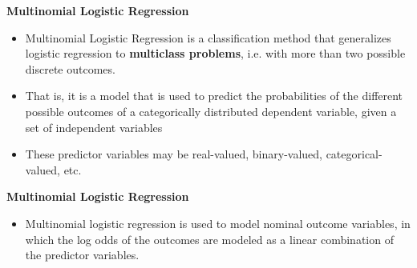 \documentclass[00-GLMregslides.tex]{subfiles}
\begin{document}
	
\begin{frame}
\Large
	
\textbf{Multinomial Logistic Regression}\\
\bigskip
\begin{itemize}
\item Multinomial Logistic Regression is a classification method that generalizes logistic regression to \textbf{multiclass problems}, 
i.e. with more than two possible discrete outcomes.
\item That is, it is a model that is used to predict the probabilities of the different possible outcomes of a 
categorically distributed dependent variable, given a set of independent 
variables 
\item These predictor variables may be real-valued, binary-valued, categorical-valued, etc.
\end{itemize}
 
\end{frame}
	
\begin{frame}
\Large
	
\textbf{Multinomial Logistic Regression}\\
\bigskip
\begin{itemize}
\item Multinomial logistic regression is used to model nominal outcome variables, in which the log odds of the outcomes are modeled as a linear combination of the predictor variables.
\end{itemize}
 
\end{frame}
\end{document}

